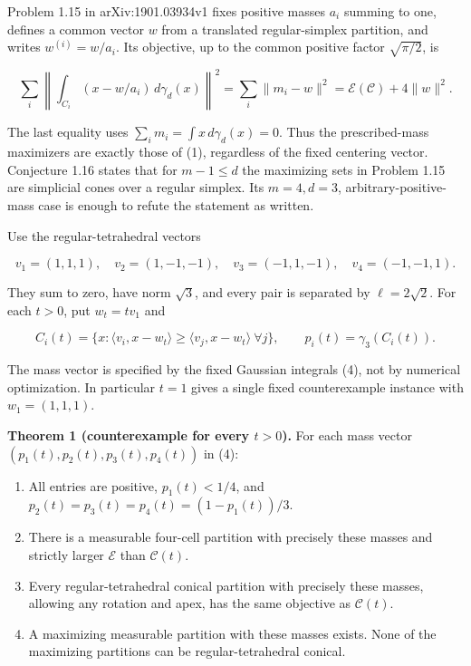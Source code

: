 \documentclass[
  11pt,
]{article}
\providecommand{\tightlist}{%
  \setlength{\itemsep}{0pt}\setlength{\parskip}{0pt}}
\begin{document}
Problem 1.15 in arXiv:1901.03934v1 fixes positive masses \(a_i\) summing
to one, defines a common vector \(w\) from a translated regular-simplex
partition, and writes \(w^{(i)}=w/a_i\). Its objective, up to the common
positive factor \(\sqrt{\pi/2}\), is

\[
 \sum_i\left\|\int_{C_i}(x-w/a_i)\,d\gamma_d(x)\right\|^2
 =\sum_i\|m_i-w\|^2
 =\mathcal E(\mathcal C)+4\|w\|^2.                       \tag{2}
\]

The last equality uses \(\sum_i m_i=\int x\,d\gamma_d(x)=0\). Thus the
prescribed-mass maximizers are exactly those of (1), regardless of the
fixed centering vector. Conjecture 1.16 states that for \(m-1\le d\) the
maximizing sets in Problem 1.15 are simplicial cones over a regular
simplex. Its \(m=4,d=3\), arbitrary-positive-mass case is enough to
refute the statement as written.

Use the regular-tetrahedral vectors

\[
 v_1=(1,1,1),\quad v_2=(1,-1,-1),\quad
 v_3=(-1,1,-1),\quad v_4=(-1,-1,1).                       \tag{3}
\]

They sum to zero, have norm \(\sqrt3\), and every pair is separated by
\(\ell=2\sqrt2\). For each \(t>0\), put \(w_t=t v_1\) and

\[
 C_i(t)=\{x:\langle v_i,x-w_t\rangle\ge
                   \langle v_j,x-w_t\rangle\ \forall j\},\qquad
 p_i(t)=\gamma_3(C_i(t)).                                \tag{4}
\]

The mass vector is specified by the fixed Gaussian integrals (4), not by
numerical optimization. In particular \(t=1\) gives a single fixed
counterexample instance with \(w_1=(1,1,1)\).

\textbf{Theorem 1 (counterexample for every \(t>0\)).} For each mass
vector \((p_1(t),p_2(t),p_3(t),p_4(t))\) in (4):

\begin{enumerate}
\def\labelenumi{\arabic{enumi}.}
\tightlist
\item
  All entries are positive, \(p_1(t)<1/4\), and
  \(p_2(t)=p_3(t)=p_4(t)=(1-p_1(t))/3\).
\item
  There is a measurable four-cell partition with precisely these masses
  and strictly larger \(\mathcal E\) than \(\mathcal C(t)\).
\item
  Every regular-tetrahedral conical partition with precisely these
  masses, allowing any rotation and apex, has the same objective as
  \(\mathcal C(t)\).
\item
  A maximizing measurable partition with these masses exists. None of
  the maximizing partitions can be regular-tetrahedral conical.
\end{enumerate}
\end{document}
